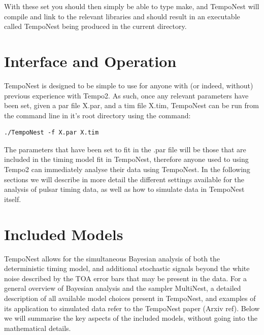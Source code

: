 \documentclass[%
 preprint,
 amsmath,amssymb,amsfonts,
 aps,
]{revtex4-1}
\begin{document}
With these set you should then simply be able to type make, and TempoNest will compile and link to the relevant libraries and should result in an executable called TempoNest being produced in the current directory.

\section{Interface and Operation}
\label{Section:Interface}

TempoNest is designed to be simple to use for anyone with (or indeed, without) previous experience with Tempo2.  As such, once any relevant parameters have been set, given a par file X.par, and a tim file X.tim, TempoNest can be run from the command line in it's root directory using the command:
%
\begin{lstlisting}
./TempoNest -f X.par X.tim
\end{lstlisting}
%
The parameters that have been set to fit in the .par file will be those that are included in the timing model fit in TempoNest, therefore anyone used to using Tempo2 can immediately analyse their data using TempoNest.  In the following sections we will describe in more detail the different settings available for the analysis of pulsar timing data, as well as how to simulate data in TempoNest itself.


\section{Included Models}
\label{Section:Model}

TempoNest allows for the simultaneous Bayesian  analysis of both the deterministic timing model, and additional stochastic signals beyond the white noise described by the TOA error bars that may be present in the data.  For a general overview of Bayesian analysis and the sampler MultiNest, a detailed description of all available model choices present in TempoNest, and examples of its application to simulated data refer to the TempoNest paper (Arxiv ref).  Below we will summarise the key aspects of the included models, without going into the mathematical details.
\end{document}
